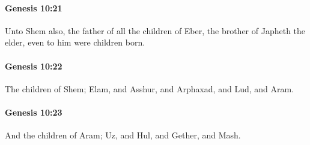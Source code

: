 		\paragraph{Genesis 10:21} %
			\label{GENESIS-10-21}

			Unto Shem also, the father of all the children of Eber, the brother of Japheth the elder, even to him were children born.


		\paragraph{Genesis 10:22} %
			\label{GENESIS-10-22}

			The children of Shem; Elam, and Asshur, and Arphaxad, and Lud, and Aram.


		\paragraph{Genesis 10:23} %
			\label{GENESIS-10-23}

			And the children of Aram; Uz, and Hul, and Gether, and Mash.


